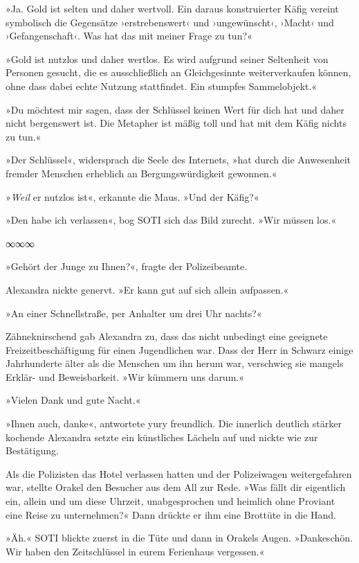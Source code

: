 »Ja. Gold ist selten und daher wertvoll. Ein daraus konstruierter Käfig vereint symbolisch die Gegensätze ›erstrebenswert‹ und ›ungewünscht‹, ›Macht‹ und ›Gefangenschaft‹. Was hat das mit meiner Frage zu tun?«

»Gold ist nutzlos und daher wertlos. Es wird aufgrund seiner Seltenheit von Personen gesucht, die es ausschließlich an Gleichgesinnte weiterverkaufen können, ohne dass dabei echte Nutzung stattfindet. Ein stumpfes Sammelobjekt.«

»Du möchtest mir sagen, dass der Schlüssel keinen Wert für dich hat und daher nicht bergenswert ist. Die Metapher ist mäßig toll und hat mit dem Käfig nichts zu tun.«

»Der Schlüssel«, widersprach die Seele des Internets, »hat durch die Anwesenheit fremder Menschen erheblich an Bergungswürdigkeit gewonnen.«

»\emph{Weil} er nutzlos ist«, erkannte die Maus. »Und der Käfig?«

»Den habe ich verlassen«, bog SOTI sich das Bild zurecht. »Wir müssen los.«

\begin{center}
∞∞∞
\end{center}

»Gehört der Junge zu Ihnen?«, fragte der Polizeibeamte.

Alexandra nickte genervt. »Er kann gut auf sich allein aufpassen.«

»An einer Schnellstraße, per Anhalter um drei Uhr nachts?«

Zähneknirschend gab Alexandra zu, dass das nicht unbedingt eine geeignete Freizeitbeschäftigung für einen Jugendlichen war. Dass der Herr in Schwarz einige Jahrhunderte älter als die Menschen um ihn herum war, verschwieg sie mangels Erklär- und Beweisbarkeit. »Wir kümmern uns darum.«

»Vielen Dank und gute Nacht.«

»Ihnen auch, danke«, antwortete yury freundlich. Die innerlich deutlich stärker kochende Alexandra setzte ein künstliches Lächeln auf und nickte wie zur Bestätigung.

Als die Polizisten das Hotel verlassen hatten und der Polizeiwagen weitergefahren war, stellte Orakel den Besucher aus dem All zur Rede. »Was fällt dir eigentlich ein, allein und um diese Uhrzeit, unabgesprochen und heimlich ohne Proviant eine Reise zu unternehmen?« Dann drückte er ihm eine Brottüte in die Hand.

»Äh.« SOTI blickte zuerst in die Tüte und dann in Orakels Augen. »Dankeschön. Wir haben den Zeitschlüssel in eurem Ferienhaus vergessen.«

